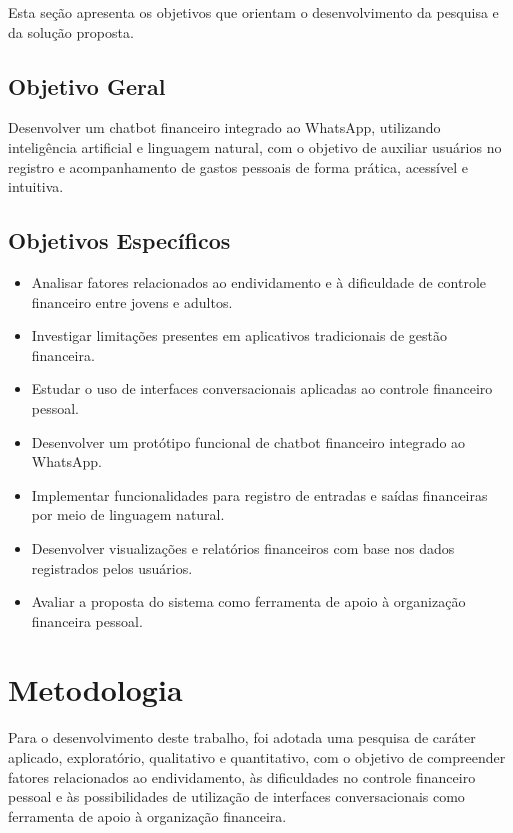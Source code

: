 Esta seção apresenta os objetivos que orientam o desenvolvimento da pesquisa e da solução proposta.

\subsection{Objetivo Geral}

Desenvolver um chatbot financeiro integrado ao WhatsApp, utilizando inteligência artificial e linguagem natural, com o objetivo de auxiliar usuários no registro e acompanhamento de gastos pessoais de forma prática, acessível e intuitiva.

\subsection{Objetivos Específicos}

\begin{itemize}
    \item Analisar fatores relacionados ao endividamento e à dificuldade de controle financeiro entre jovens e adultos.
    \item Investigar limitações presentes em aplicativos tradicionais de gestão financeira.
    \item Estudar o uso de interfaces conversacionais aplicadas ao controle financeiro pessoal.
    \item Desenvolver um protótipo funcional de chatbot financeiro integrado ao WhatsApp.
    \item Implementar funcionalidades para registro de entradas e saídas financeiras por meio de linguagem natural.
    \item Desenvolver visualizações e relatórios financeiros com base nos dados registrados pelos usuários.
    \item Avaliar a proposta do sistema como ferramenta de apoio à organização financeira pessoal.
\end{itemize}

\section{Metodologia}

Para o desenvolvimento deste trabalho, foi adotada uma pesquisa de caráter aplicado, exploratório, qualitativo e quantitativo, com o objetivo de compreender fatores relacionados ao endividamento, às dificuldades no controle financeiro pessoal e às possibilidades de utilização de interfaces conversacionais como ferramenta de apoio à organização financeira.


